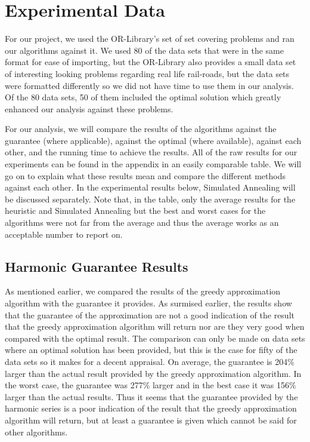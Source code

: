 

\chapter{Experimental Data}
For our project, we used the OR-Library's set of set covering problems and ran our algorithms against it. We used 80 of the data sets that were in the same format for ease of importing, but the OR-Library also provides a small data set of interesting looking problems regarding real life rail-roads, but the data sets were formatted differently so we did not have time to use them in our analysis. Of the 80 data sets, 50 of them included the optimal solution which greatly enhanced our analysis against these problems.

For our analysis, we will compare the results of the algorithms against the guarantee (where applicable), against the optimal (where available), against each other, and the running time to achieve the results. All of the raw results for our experiments can be found in the appendix in an easily comparable table. We will go on to explain what these results mean and compare the different methods against each other. In the experimental results below, Simulated Annealing will be discussed separately. Note that, in the table, only the average results for the heuristic and Simulated Annealing but the best and worst cases for the algorithms were not far from the average and thus the average works as an acceptable number to report on.

\section{Harmonic Guarantee Results}
As mentioned earlier, we compared the results of the greedy approximation algorithm with the guarantee it provides. As surmised earlier, the results show that the guarantee of the approximation are not a good indication of the result that the greedy approximation algorithm will return nor are they very good when compared with the optimal result. The comparison can only be made on data sets where an optimal solution has been provided, but this is the case for fifty of the data sets so it makes for a decent appraisal. On average, the guarantee is 204\% larger than the actual result provided by the greedy approximation algorithm. In the worst case, the guarantee was 277\% larger and in the best case it was 156\% larger than the actual results. Thus it seems that the guarantee provided by the harmonic series is a poor indication of the result that the greedy approximation algorithm will return, but at least a guarantee is given which cannot be said for other algorithms.

